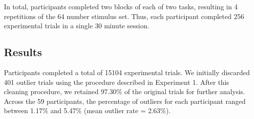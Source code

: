\documentclass[english,man]{apa6}
\theoremstyle{definition}
\theoremstyle{definition}
\theoremstyle{definition}
\theoremstyle{remark}
\begin{document}
In total, participants completed two blocks of each of two tasks,
resulting in 4 repetitions of the 64 number stimulus set. Thus, each
participant completed 256 experimental trials in a single 30 minute
session.

\subsection{Results}\label{results-1}

Participants completed a total of 15104 experimental trials. We
initially discarded 401 outlier trials using the procedure described in
Experiment 1. After this cleaning procedure, we retained 97.30\% of the
original trials for further analysis. Across the 59 participants, the
percentage of outliers for each participant ranged between 1.17\% and
5.47\% (mean outlier rate = 2.63\%).
\end{document}
